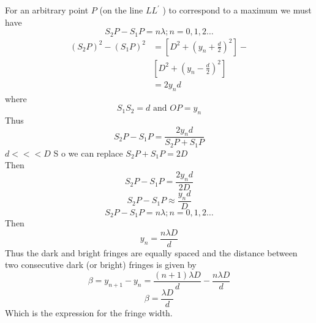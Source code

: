 For an arbitrary point $P$ (on the line $L L^{\prime}$ ) to correspond to a maximum we must have
$$
S_{2} P-S_{1} P=n \lambda ; n=0,1,2 \ldots
$$
$$\begin{aligned}
\left(S_{2} P\right)^{2}-\left(S_{1} P\right)^{2} &=\left[D^{2}+\left(y_{n}+\frac{d}{2}\right)^{2}\right]-\\
&\left[D^{2}+\left(y_{n}-\frac{d}{2}\right)^{2}\right] \\
&=2 y_{n} d
\end{aligned}$$
where
$$
S_{1} S_{2}=d \text { and } O P=y_{n}
$$
Thus
$$
S_{2} P-S_{1} P=\frac{2 y_{n} d}{S_{2} P+S_{1} P}
$$
$d<<<D$ S o we can replace $S_{2} P+S_{1} P=2D$\\
Then \\
$$
S_{2} P-S_{1} P=\frac{2 y_{n} d}{2D}
$$
$$S_{2} P-S_{1} P \approx \frac{y_{n} d}{D}$$
$$
S_{2} P-S_{1} P=n \lambda ; n=0,1,2 \ldots
$$
Then \\
$$y_{n}=\frac{n \lambda D}{d}$$
Thus the dark and bright fringes are equally spaced and the distance between two consecutive dark (or bright) fringes is given by
$$
\beta=y_{n+1}-y_{n}=\frac{(n+1) \lambda D}{d}-\frac{n \lambda D}{d}
$$
$$\beta=\frac{\lambda D}{d}$$
Which is the expression for the fringe width.\\

